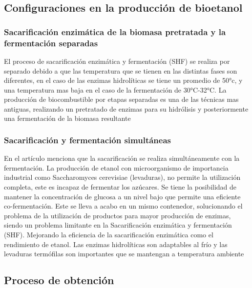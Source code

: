 \documentclass[12pt]{article}
\begin{document}
\begin{appendix}
		
		
		
		\subsection{Configuraciones en la producción de bioetanol}	
		\subsubsection{Sacarificación enzimática de la biomasa pretratada y la fermentación separadas}
		
		El proceso de sacarificación enzimática y fermentación (SHF) se realiza por separado debido a que las temperatura que se tienen en las distintas fases son diferentes, en el caso de las enzimas hidrolíticas se tiene un promedio de 50°c, y una temperatura mas baja en el caso de la fermentación de 30°C-32°C. 
		La producción de biocombustible por etapas separadas es una de las técnicas mas antiguas, realizando un pretratado de enzimas para su hidrólisis y posteriormente una fermentación de la biomasa resultante %
		
		
		
		
		\subsubsection{Sacarificación y fermentación simultáneas}
		
		En el artículo %
		menciona que la sacarificación se realiza simultáneamente con la fermentación.
		La producción de etanol con microorganismo de importancia industrial como Saccharomyces cerevisiae (levaduras), no permite la utilización completa, este es incapaz de fermentar los azúcares. Se tiene la posibilidad de mantener la concentración de glucosa a un nivel bajo que permite una eficiente co-fermentación.
		Este se lleva a acabo en un mismo contenedor, solucionando el problema de la utilización de productos para mayor producción de enzimas, siendo un problema limitante en la Sacarificación enzimática y fermentación (SHF). Mejorando la eficiencia de la sacarificación enzimática como el rendimiento de etanol. 
		Las enzimas hidrolíticas son adaptables al frío y las levaduras termófilas son importantes que se mantengan a temperatura ambiente %
		
		\subsection{Proceso de obtención }		
		

\end{appendix}
\end{document}
